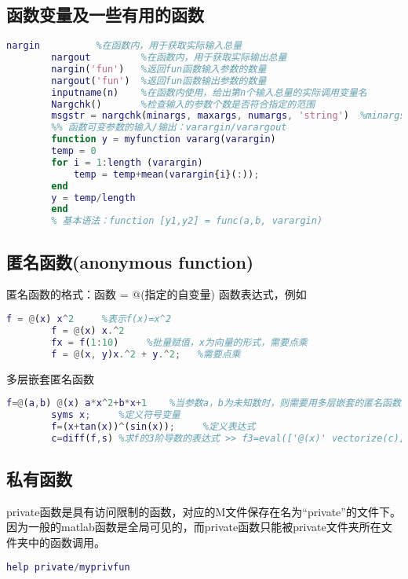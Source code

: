     \subsection{函数变量及一些有用的函数}
        \par
        \begin{lstlisting}[language=Matlab]
        nargin          %在函数内，用于获取实际输入总量
        nargout         %在函数内，用于获取实际输出总量
        nargin('fun')   %返回fun函数输入参数的数量
        nargout('fun')  %返回fun函数输出参数的数量
        inputname(n)    %在函数内使用，给出第n个输入总量的实际调用变量名
        Nargchk()       %检查输入的参数个数是否符合指定的范围
        msgstr = nargchk(minargs, maxargs, numargs, 'string')  %minargs和maxargs分别为参数个数的最小值最大值，numargs为求得的输入项的项数，可直接为函数nargin如果输入变量个数超出范围，则返回错误信息；如果变量个数在范围内则返回空矩阵。
        %% 函数可变参数的输入/输出：varargin/varargout
        function y = myfunction vararg(varargin)
        temp = 0
        for i = 1:length (varargin)
            temp = temp+mean(varargin{i}(:));
        end
        y = temp/length
        end
        % 基本语法：function [y1,y2] = func(a,b, varargin)
        \end{lstlisting}
    \subsection{匿名函数(anonymous function)}
        匿名函数的格式：函数 = $@$(指定的自变量) 函数表达式，例如
        \begin{lstlisting}[language=Matlab]
        f = @(x) x^2     %表示f(x)=x^2
        f = @(x) x.^2
        fx = f(1:10)     %批量赋值，x为向量的形式，需要点乘
        f = @(x, y)x.^2 + y.^2;   %需要点乘
        \end{lstlisting}
        多层嵌套匿名函数
        \begin{lstlisting}[language=Matlab]
        f=@(a,b) @(x) a*x^2+b*x+1    %当参数a，b为未知数时，则需要用多层嵌套的匿名函数来表示。
        syms x;     %定义符号变量
        f=(x+tan(x))^(sin(x));     %定义表达式
        c=diff(f,s) %求f的3阶导数的表达式 >> f3=eval(['@(x)' vectorize(c)]);    %vectorize函数的功能是使内联函 数适合数组运算的法则。
        \end{lstlisting}
    \subsection{私有函数}
        private函数是具有访问限制的函数，对应的M文件保存在名为“private”的文件下。因为一般的matlab函数是全局可见的，而private函数只能被private文件夹所在文件夹中的函数调用。
        \begin{lstlisting}[language=Matlab]
        help private/myprivfun
        \end{lstlisting}

